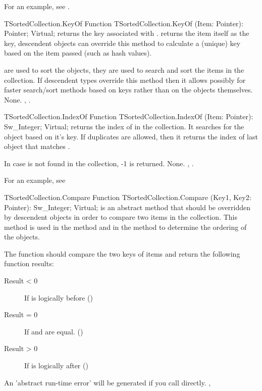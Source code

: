 For an example, see .

\begin{function}{TSortedCollection.KeyOf}
\Declaration
Function TSortedCollection.KeyOf (Item: Pointer): Pointer; Virtual;
\Description
{} returns the key associated with .
 returns the item itself as the key, descendent
objects can override this method to calculate a (unique) key based on the
item passed (such as hash values).

 are used to sort the objects, they are used to search and sort
the items in the collection. If descendent types override this method then
it allows possibly for faster search/sort methods based on keys rather than
on the objects themselves.
\Errors
None.
\SeeAlso
{},
.
\end{function}

\begin{function}{TSortedCollection.IndexOf}
\Declaration
Function TSortedCollection.IndexOf (Item: Pointer): Sw\_Integer; Virtual;
\Description
{} returns the index of  in the collection. It searches
for the object based on it's key. If duplicates are allowed, then it returns 
the index of last object that matches .

In case  is not found in the collection, -1 is returned.
\Errors
None.
\SeeAlso
{},
.
\end{function}

For an example, see 

\begin{function}{TSortedCollection.Compare}
\Declaration
Function TSortedCollection.Compare (Key1, Key2: Pointer): Sw\_Integer; Virtual;
\Description
{} is an abstract method that should be overridden by descendent
objects in order to compare two items in the collection. This method is used
in the  method and in the
 method to determine the ordering of
the objects.

The function should compare the two keys of items and return the following
function results:
\begin{description}
\item [Result < 0] If  is logically before 
()
\item [Result = 0] If  and  are equal. ()
\item [Result > 0] If  is logically after 
()
\end{description}
\Errors
An 'abstract run-time error' will be generated if you call
 directly.
\SeeAlso
{},
\end{function}

